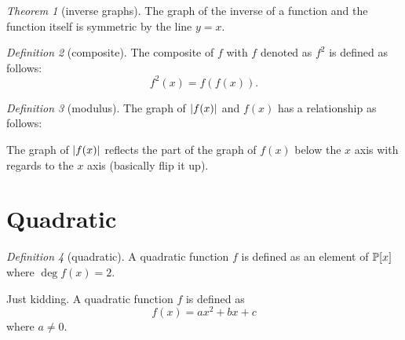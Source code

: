 \documentclass[8pt]{article}
\theoremstyle{remark}
\newtheorem{theorem}{Theorem}[section]
\newtheorem{definition}[theorem]{Definition}
\begin{document}
        \begin{theorem}[inverse graphs]
            The graph of the inverse of a function and the function itself is symmetric by the line $y = x$.
        \end{theorem}

        \begin{definition}[composite]
            The composite of $f$ with $f$ denoted as $f^2$ is defined as follows:
            $$
            f^2(x) = f(f(x)).
            $$
        \end{definition}

        \begin{definition}[modulus]
            The graph of $\left\lvert f(x) \right\rvert$ and $f(x)$ has a relationship as follows:

            The graph of $\left\lvert f(x) \right\rvert$ reflects the part of the graph of $f(x)$ below the $x$ axis with regards to the $x$ axis (basically flip it up).
        \end{definition}

    \section{Quadratic}
        \begin{definition}[quadratic]
            A quadratic function $f$ is defined as an element of $\mathbb{P}[x]$ where $\deg f(x) = 2$.

            Just kidding. A quadratic function $f$ is defined as
            $$
            f(x) = ax^2 + bx + c
            $$
            where $a \neq 0$.
        \end{definition}
\end{document}
